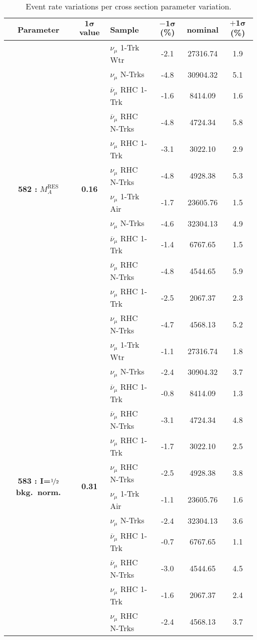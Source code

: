 \begin{table}[ht!]
\centering
\begin{tabular}{ c  c  l  c  c  c }
\midrule[1.3pt]
\textbf{Parameter} & \textbf{$\mathbf{1\sigma}$ value} & \textbf{Sample} & \textbf{$\mathbf{-1\sigma}$ (\%)}  &  \textbf{nominal}  &  \textbf{$\mathbf{+1\sigma}$ (\%)} \\
\midrule[1.3pt]
\multirow{12}{*}{\textbf{582 : }$M_A^\text{RES}$} & \multirow{12}{*}{\textbf{0.16}} & $\nu_\mu$ 1-Trk Wtr &   -2.1 &  27316.74 &   1.9 \\ 
 &  & $\nu_\mu$ N-Trks &   -4.8 &  30904.32 &   5.1 \\ 
 &  & $\overline{\nu}_\mu$ RHC 1-Trk &   -1.6 &  8414.09 &   1.6 \\ 
 &  & $\overline{\nu}_\mu$ RHC N-Trks &   -4.8 &  4724.34 &   5.8 \\ 
 &  & $\nu_\mu$ RHC 1-Trk &   -3.1 &  3022.10 &   2.9 \\ 
 &  & $\nu_\mu$ RHC N-Trks &   -4.8 &  4928.38 &   5.3 \\ 
 &  & $\nu_\mu$ 1-Trk Air &   -1.7 &  23605.76 &   1.5 \\ 
 &  & $\nu_\mu$ N-Trks &   -4.6 &  32304.13 &   4.9 \\ 
 &  & $\overline{\nu}_\mu$ RHC 1-Trk &   -1.4 &  6767.65 &   1.5 \\ 
 &  & $\overline{\nu}_\mu$ RHC N-Trks &   -4.8 &  4544.65 &   5.9 \\ 
 &  & $\nu_\mu$ RHC 1-Trk &   -2.5 &  2067.37 &   2.3 \\ 
 &  & $\nu_\mu$ RHC N-Trks &   -4.7 &  4568.13 &   5.2 \\ 
\midrule[1.3pt]
\multirow{12}{*}{\textbf{583 : I=}$\nicefrac{1}{2}$ \textbf{bkg.\ norm.}} & \multirow{12}{*}{\textbf{0.31}} & $\nu_\mu$ 1-Trk Wtr &   -1.1 &  27316.74 &   1.8 \\ 
 &  & $\nu_\mu$ N-Trks &   -2.4 &  30904.32 &   3.7 \\ 
 &  & $\overline{\nu}_\mu$ RHC 1-Trk &   -0.8 &  8414.09 &   1.3 \\ 
 &  & $\overline{\nu}_\mu$ RHC N-Trks &   -3.1 &  4724.34 &   4.8 \\ 
 &  & $\nu_\mu$ RHC 1-Trk &   -1.7 &  3022.10 &   2.5 \\ 
 &  & $\nu_\mu$ RHC N-Trks &   -2.5 &  4928.38 &   3.8 \\ 
 &  & $\nu_\mu$ 1-Trk Air &   -1.1 &  23605.76 &   1.6 \\ 
 &  & $\nu_\mu$ N-Trks &   -2.4 &  32304.13 &   3.6 \\ 
 &  & $\overline{\nu}_\mu$ RHC 1-Trk &   -0.7 &  6767.65 &   1.1 \\ 
 &  & $\overline{\nu}_\mu$ RHC N-Trks &   -3.0 &  4544.65 &   4.5 \\ 
 &  & $\nu_\mu$ RHC 1-Trk &   -1.6 &  2067.37 &   2.4 \\ 
 &  & $\nu_\mu$ RHC N-Trks &   -2.4 &  4568.13 &   3.7 \\ 
\midrule[1.3pt]
\end{tabular}
\centering
\caption*{Event rate variations per cross section parameter variation.}
\end{table}
\addtocounter{table}{-1}

